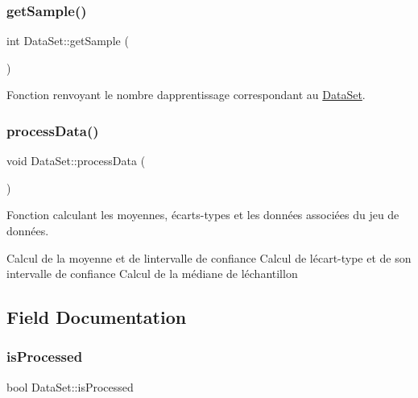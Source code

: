 \subsubsection{\texorpdfstring{get\+Sample()}{getSample()}}
{\footnotesize\ttfamily int Data\+Set\+::get\+Sample (\begin{DoxyParamCaption}{ }\end{DoxyParamCaption})}



Fonction renvoyant le nombre d\textquotesingle{}apprentissage correspondant au \hyperlink{classDataSet}{Data\+Set}. 

\mbox{\label{classDataSet_a6e174dbffadb1a262c6cc92781d0bd12}} 
\subsubsection{\texorpdfstring{process\+Data()}{processData()}}
{\footnotesize\ttfamily void Data\+Set\+::process\+Data (\begin{DoxyParamCaption}{ }\end{DoxyParamCaption})}



Fonction calculant les moyennes, écarts-\/types et les données associées du jeu de données. 

Calcul de la moyenne et de l\textquotesingle{}intervalle de confiance Calcul de l\textquotesingle{}écart-\/type et de son intervalle de confiance Calcul de la médiane de l\textquotesingle{}échantillon 

\subsection{Field Documentation}
\mbox{\label{classDataSet_acc6a6082256c926e1ad8bfa713966441}} 
\subsubsection{\texorpdfstring{is\+Processed}{isProcessed}}
{\footnotesize\ttfamily bool Data\+Set\+::is\+Processed\hspace{0.3cm}{\ttfamily [private]}}



